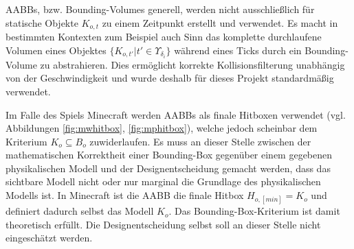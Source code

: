 AABBs, bzw. Bounding-Volumes generell, werden nicht ausschließlich für statische Objekte $K_{o,t}$ zu einem Zeitpunkt erstellt und verwendet. Es macht in bestimmten Kontexten zum Beispiel auch Sinn das komplette durchlaufene Volumen eines Objektes $\{K_{o,t'} | t' \in \Upsilon_{\delta_i}\}$ während eines Ticks durch ein Bounding-Volume zu abstrahieren. Dies ermöglicht korrekte Kollisionsfilterung unabhängig von der Geschwindigkeit und wurde deshalb für dieses Projekt standardmäßig verwendet.

Im Falle des Spiels Minecraft werden AABBs als finale Hitboxen verwendet (vgl. Abbildungen \ref{fig:mwhitbox}, \ref{fig:mphitbox}), welche jedoch scheinbar dem Kriterium $K_o \subseteq B_o$ zuwiderlaufen. Es muss an dieser Stelle zwischen der mathematischen Korrektheit einer Bounding-Box gegenüber einem gegebenen physikalischen Modell und der Designentscheidung gemacht werden, dass das sichtbare Modell nicht oder nur marginal die Grundlage des physikalischen Modells ist. In Minecraft ist die AABB die finale Hitbox  $H_{o, [min]} = K_o$ und definiert dadurch selbst das Modell $K_o$. Das Bounding-Box-Kriterium ist damit theoretisch erfüllt. Die Designentscheidung selbst soll an dieser Stelle nicht eingeschätzt werden.
